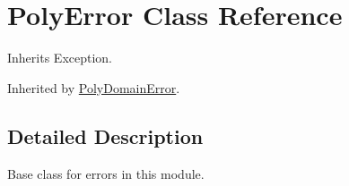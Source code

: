 \hypertarget{classpyneb_1_1utils_1_1polyutils_1_1_poly_error}{\section{Poly\-Error Class Reference}
\label{classpyneb_1_1utils_1_1polyutils_1_1_poly_error}
}


Inherits Exception.



Inherited by \hyperlink{classpyneb_1_1utils_1_1polyutils_1_1_poly_domain_error}{Poly\-Domain\-Error}.



\subsection{Detailed Description}
\begin{DoxyVerb}Base class for errors in this module.\end{DoxyVerb}
 